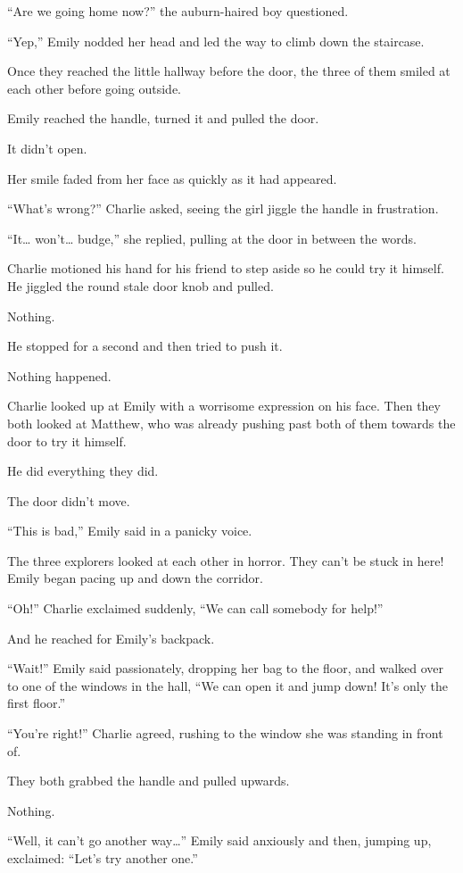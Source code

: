 “Are we going home now?” the auburn-haired boy questioned.

“Yep,” Emily nodded her head and led the way to climb down the staircase.

Once they reached the little hallway before the door, the three of them smiled at each other before going outside.

Emily reached the handle, turned it and pulled the door.

It didn't open.

Her smile faded from her face as quickly as it had appeared.

“What's wrong?” Charlie asked, seeing the girl jiggle the handle in frustration.

“It… won't… budge,” she replied, pulling at the door in between the words.

Charlie motioned his hand for his friend to step aside so he could try it himself. He jiggled the round stale door knob and pulled.

Nothing.

He stopped for a second and then tried to push it.

Nothing happened.

Charlie looked up at Emily with a worrisome expression on his face. Then they both looked at Matthew, who was already pushing past both of them towards the door to try it himself.

He did everything they did.

The door didn't move.

“This is bad,” Emily said in a panicky voice.

The three explorers looked at each other in horror. They can't be stuck in here! Emily began pacing up and down the corridor.

“Oh!” Charlie exclaimed suddenly, “We can call somebody for help!”

And he reached for Emily's backpack.

“Wait!” Emily said passionately, dropping her bag to the floor, and walked over to one of the windows in the hall, “We can open it and jump down! It's only the first floor.”

“You're right!” Charlie agreed, rushing to the window she was standing in front of.

They both grabbed the handle and pulled upwards.

Nothing.

“Well, it can't go another way…” Emily said anxiously and then, jumping up, exclaimed: “Let's try another one.”

